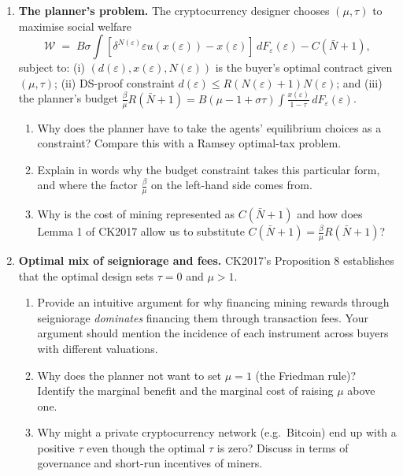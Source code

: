 \documentclass[11pt]{article}
\begin{document}
\begin{enumerate}

\item \textbf{The planner's problem.}
The cryptocurrency designer chooses $(\mu,\tau)$ to maximise social welfare
\[
    \mathcal{W} \;=\; B\sigma \!\int [\delta^{N(\varepsilon)}\varepsilon u(x(\varepsilon)) - x(\varepsilon)]\,dF_\varepsilon(\varepsilon) - C(\bar N+1),
\]
subject to: (i) $(d(\varepsilon),x(\varepsilon),N(\varepsilon))$ is the buyer's optimal contract given $(\mu,\tau)$;
(ii) DS-proof constraint $d(\varepsilon) \le R(N(\varepsilon)+1)N(\varepsilon)$; and (iii) the planner's budget
$\frac{\beta}{\mu}R(\bar N+1) = B(\mu - 1 + \sigma\tau)\!\int\frac{x(\varepsilon)}{1-\tau}\,dF_\varepsilon(\varepsilon)$.
\begin{enumerate}
    \item Why does the planner have to take the agents' equilibrium choices as a constraint?
          Compare this with a Ramsey optimal-tax problem.
    \item Explain in words why the budget constraint takes this particular form, and where the
          factor $\frac{\beta}{\mu}$ on the left-hand side comes from.
    \item Why is the cost of mining represented as $C(\bar N+1)$ and how does Lemma 1 of CK2017
          allow us to substitute $C(\bar N+1) = \frac{\beta}{\mu}R(\bar N+1)$?
\end{enumerate}

\item \textbf{Optimal mix of seigniorage and fees.}
CK2017's Proposition 8 establishes that the optimal design sets $\tau=0$ and $\mu>1$.
\begin{enumerate}
    \item Provide an intuitive argument for why financing mining rewards through seigniorage
          \emph{dominates} financing them through transaction fees. Your argument should
          mention the incidence of each instrument across buyers with different valuations.
    \item Why does the planner not want to set $\mu = 1$ (the Friedman rule)?
          Identify the marginal benefit and the marginal cost of raising $\mu$ above one.
    \item Why might a private cryptocurrency network (e.g.\ Bitcoin) end up with a positive
          $\tau$ even though the optimal $\tau$ is zero? Discuss in terms of governance and
          short-run incentives of miners.
\end{enumerate}


\end{enumerate}
\end{document}
